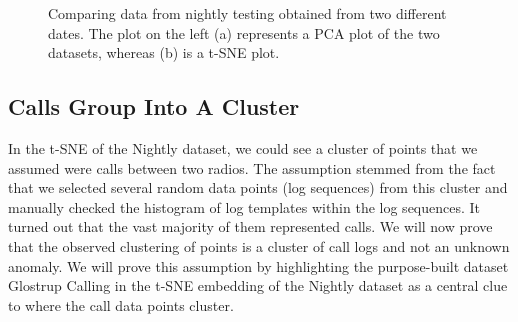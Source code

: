 \begin{figure}%
    \centering
    \qquad
    \caption{Comparing data from nightly testing obtained from two different dates. The plot on the left (a) represents a PCA plot of the two datasets, whereas (b) is a t-SNE plot.}%
    \label{fig:tsne-nights-comparison}%
\end{figure}


\subsection{Calls Group Into A Cluster}
\label{assumption-calls}
In the t-SNE of the Nightly dataset, we could see a cluster of points that we assumed were calls between two radios. The assumption stemmed from the fact that we selected several random data points (log sequences) from this cluster and manually checked the histogram of log templates within the log sequences. It turned out that the vast majority of them represented calls. We will now prove that the observed clustering of points is a cluster of call logs and not an unknown anomaly. We will prove this assumption by highlighting the purpose-built dataset Glostrup Calling in the t-SNE embedding of the Nightly dataset as a central clue to where the call data points cluster.

